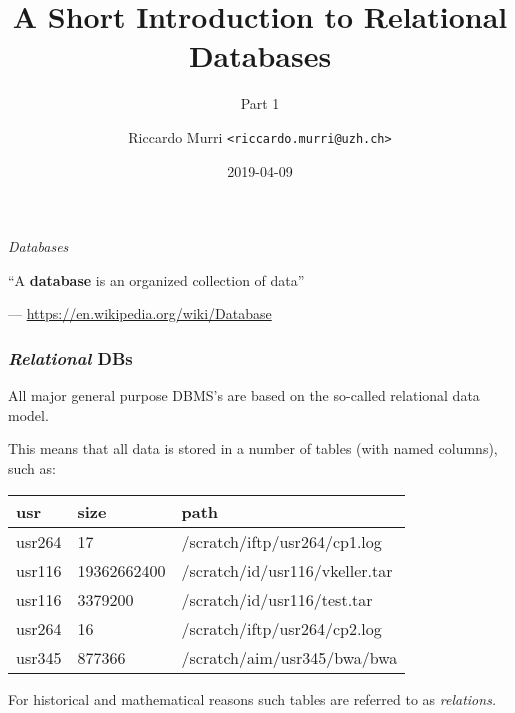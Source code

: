 \documentclass[english,serif,mathserif]{beamer}
\begin{document}
\title[Databases]{A Short Introduction to Relational Databases}
\subtitle{Part 1}
\author{Riccardo Murri \texttt{<riccardo.murri@uzh.ch>}}
\date{2019-04-09}

\maketitle


\begin{frame}
  \centering

  \+
  {\Huge\itshape Databases}
\end{frame}

\begin{frame}
  \centering

  ``A \textbf{database} is an organized collection of data''


  \+
  \begin{flushright}
    --- \url{https://en.wikipedia.org/wiki/Database}
  \end{flushright}
\end{frame}


\begin{frame}
  \frametitle{\emph{Relational} DBs}

  All major general purpose DBMS's are based on the so-called relational
  data model.

  \+ This means that all data is stored in a number of tables (with named
  columns), such as:

  \begin{center}
    \small
    \begin{tabular}{lll}
      \textbf{usr}
             & \textbf{size}
                           & \textbf{path}                  \\
      \hline
      usr264 &          17 & /scratch/iftp/usr264/cp1.log   \\
      usr116 & 19362662400 & /scratch/id/usr116/vkeller.tar \\
      usr116 &     3379200 & /scratch/id/usr116/test.tar    \\
      usr264 &          16 & /scratch/iftp/usr264/cp2.log   \\
      usr345 &      877366 & /scratch/aim/usr345/bwa/bwa    \\
    \end{tabular}
  \end{center}

  For historical and mathematical reasons such tables are referred to as
  \emph{relations.}
\end{frame}
\end{document}
